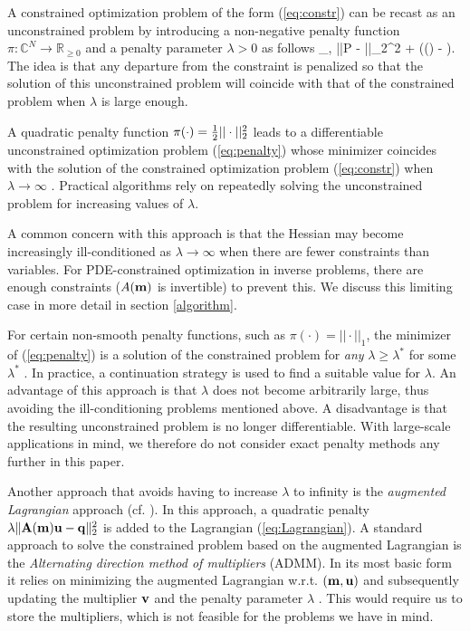 \documentclass{iopart}
\begin{document}
A constrained optimization problem of the form (\ref{eq:constr}) can be recast as an unconstrained problem by introducing a non-negative penalty function $\pi: \mathbb{C}^{N}\rightarrow\mathbb{R}_{\geq 0}$ and a penalty parameter $\lambda>0$ as follows
\bq
\label{eq:penalty}
\min_{,} ||P - ||_2^2 + \lambda\pi(() - ).
\eq
The idea is that any departure from the constraint is penalized so that the solution of this unconstrained problem will coincide with that of the constrained problem when $\lambda$ is large enough.

A quadratic penalty function $\pi(\cdot) = {\textstyle\frac{1}{2}}||\cdot||_2^2$ leads to a differentiable unconstrained optimization problem (\ref{eq:penalty}) whose minimizer coincides with the solution of the constrained optimization problem (\ref{eq:constr}) when $\lambda \rightarrow \infty$ \cite[Thm. 17.1]{Nocedal}. Practical algorithms rely on repeatedly solving the unconstrained problem for increasing values of $\lambda$.

A common concern with this approach is that the Hessian may become increasingly ill-conditioned as $\lambda\rightarrow\infty$ when there are fewer constraints than variables. For PDE-constrained optimization in inverse problems, there are enough constraints ($A(\mathbf{m})$ is invertible) to prevent this. We discuss this limiting case in more detail in section \ref{algorithm}.

For certain non-smooth penalty functions, such as $\pi(\cdot) = ||\cdot||_1$, the minimizer of (\ref{eq:penalty}) is a solution of the constrained problem for \emph{any} $\lambda \geq \lambda^*$ for some $\lambda^*$ \cite[Thm. 17.3]{Nocedal}. In practice, a continuation strategy is used to find a suitable value for $\lambda$. An advantage of this approach is that $\lambda$ does not become arbitrarily large, thus avoiding the ill-conditioning problems mentioned above. A disadvantage is that the resulting unconstrained problem is no longer differentiable. With large-scale applications in mind, we therefore do not consider exact penalty methods any further in this paper.

Another approach that avoids having to increase $\lambda$ to infinity is the \emph{augmented Lagrangian} approach (cf. \cite{Nocedal}). In this approach, a quadratic penalty $\lambda\|\mathbf{A}(\mathbf{m})\mathbf{u} - \mathbf{q}\|_2^2$ is added to the Lagrangian (\ref{eq:Lagrangian}). A standard approach to solve the constrained problem based on the augmented Lagrangian is the \emph{Alternating direction method of multipliers} (ADMM). In its most basic form it relies on minimizing the augmented Lagrangian w.r.t. $(\mathbf{m}, \mathbf{u})$ and subsequently updating the multiplier $\mathbf{v}$ and the penalty parameter $\lambda$ \cite{Eckstein2012a,Curtis2014}. This would require us to store the multipliers, which is not feasible for the problems we have in mind.
\end{document}
